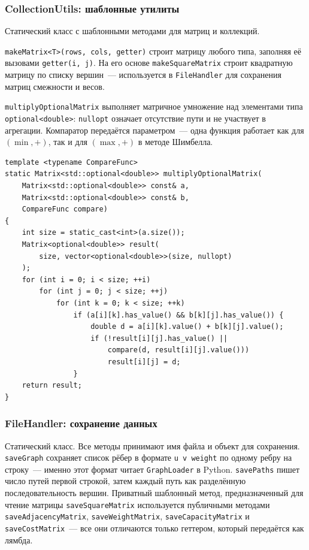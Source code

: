 \subsubsection{CollectionUtils: шаблонные утилиты}

Статический класс с шаблонными методами для матриц и коллекций.

\texttt{makeMatrix<T>(rows, cols, getter)} строит матрицу любого типа,
заполняя её вызовами \texttt{getter(i, j)}. На его основе
\texttt{makeSquareMatrix} строит квадратную матрицу по списку вершин~---
используется в \texttt{FileHandler} для сохранения матриц смежности и весов.

\texttt{multiplyOptionalMatrix} выполняет матричное умножение над элементами типа \texttt{optional<double>}: \texttt{nullopt} означает отсутствие пути
и не участвует в агрегации. Компаратор передаётся параметром~---
одна функция работает как для $(\min,+)$, так и для $(\max,+)$
в методе Шимбелла.

\begin{lstlisting}[style=cppstyle, caption={Обобщённое матричное умножение (CollectionUtils.h)}]
template <typename CompareFunc>
static Matrix<std::optional<double>> multiplyOptionalMatrix(
    Matrix<std::optional<double>> const& a,
    Matrix<std::optional<double>> const& b,
    CompareFunc compare)
{
    int size = static_cast<int>(a.size());
    Matrix<optional<double>> result(
        size, vector<optional<double>>(size, nullopt)
    );
    for (int i = 0; i < size; ++i)
        for (int j = 0; j < size; ++j)
            for (int k = 0; k < size; ++k)
                if (a[i][k].has_value() && b[k][j].has_value()) {
                    double d = a[i][k].value() + b[k][j].value();
                    if (!result[i][j].has_value() || 
                        compare(d, result[i][j].value()))
                        result[i][j] = d;
                }
    return result;
}
\end{lstlisting}

\subsubsection{FileHandler: сохранение данных}

Статический класс. Все методы принимают имя файла и объект для сохранения.
\texttt{saveGraph} сохраняет список рёбер в формате \texttt{u v weight} по
одному ребру на строку~--- именно этот формат читает \texttt{GraphLoader}
в Python. \texttt{savePaths} пишет число путей первой строкой, затем
каждый путь как разделённую последовательность вершин.
Приватный шаблонный метод, предназначенный для чтение матрицы \texttt{saveSquareMatrix} используется публичными методами
\texttt{saveAdjacencyMatrix}, \texttt{saveWeightMatrix},
\texttt{saveCapacityMatrix} и \texttt{saveCostMatrix}~--- все они
отличаются только геттером, который передаётся как лямбда.


